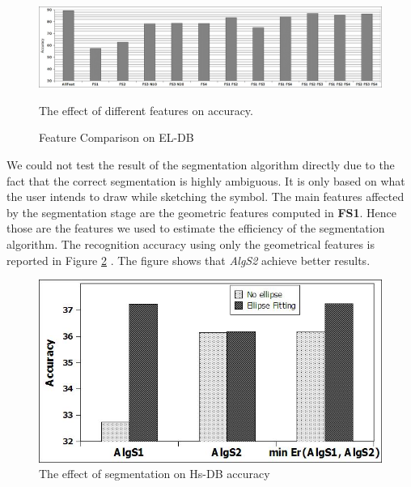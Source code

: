 \documentclass[preprint,10pt,5p,twocolumn]{elsarticle}
\begin{document}
 \begin{figure}
	\centering
		\includegraphics[scale=0.34]{images/featELc.jpg}
	\caption{Feature Comparison on EL-DB} The effect of different features on accuracy.  %
	\label{fig:ELtestFeaturesAll}
\end{figure}  
 We could not test the result of the segmentation algorithm directly due to the fact that the correct segmentation is highly ambiguous. It is only based on what the user intends to draw while sketching the symbol. 
 The main features affected by the segmentation stage are the geometric features computed in \textbf{FS1}. Hence those are the features we used to estimate the efficiency of the segmentation algorithm. The recognition accuracy using only the geometrical features is reported in Figure \ref{fig:testFeatonly} . The figure shows that \textsl{AlgS2} achieve better results.  %
\begin{figure}
	\centering
		\includegraphics[scale=0.4]{images/featureFS1only.jpg}
	\caption{The effect of segmentation on Hs-DB accuracy} %
	\label{fig:testFeatonly}
\end{figure}  
\end{document}
